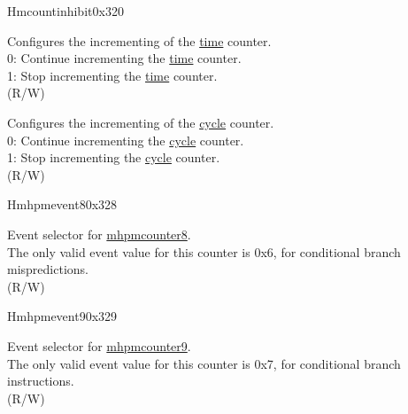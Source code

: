 \begin{register}{H}{mcountinhibit}{0x320}
\begin{regdesc}
\begin{reglist}
\label{fielddesc:MCOUNTINHIBIT_TM}\item [TM] Configures the incrementing of the \hyperref[regdesc:TIME]{time} counter. \\
0: Continue incrementing the \hyperref[regdesc:TIME]{time} counter.\\
1: Stop incrementing the \hyperref[regdesc:TIME]{time} counter. \\
(R/W) 
\label{fielddesc:MCOUNTINHIBIT_CY}\item [CY] Configures the incrementing of the \hyperref[regdesc:CYCLE]{cycle} counter. \\
0: Continue incrementing the \hyperref[regdesc:CYCLE]{cycle} counter.\\
1: Stop incrementing the \hyperref[regdesc:CYCLE]{cycle} counter.\\
(R/W)\\
\end{reglist}\end{regdesc}
\end{register}

\begin{register}{H}{mhpmevent8}{0x328}\label{regdesc:MHPMEVENT8}
%
%
\regnewline%
\begin{regdesc}\begin{reglist}
\label{fielddesc:MHPMEVENT8_EVENT}\item [{EVENT[4:0]}] Event selector for \hyperref[regdesc:MHPMCOUNTER8]{mhpmcounter8}.\\
The only valid event value for this counter is 0x6, for conditional branch mispredictions.\\
(R/W)
\end{reglist}\end{regdesc}
\end{register}

\begin{register}{H}{mhpmevent9}{0x329}\label{regdesc:MHPMEVENT9}
%
%
\regnewline%
\begin{regdesc}\begin{reglist}
\label{fielddesc:MHPMEVENT9_EVENT}\item [{EVENT[4:0]}] Event selector for \hyperref[regdesc:MHPMCOUNTER9]{mhpmcounter9}.\\
The only valid event value for this counter is 0x7, for conditional branch instructions.\\
(R/W)
\end{reglist}\end{regdesc}
\end{register}

